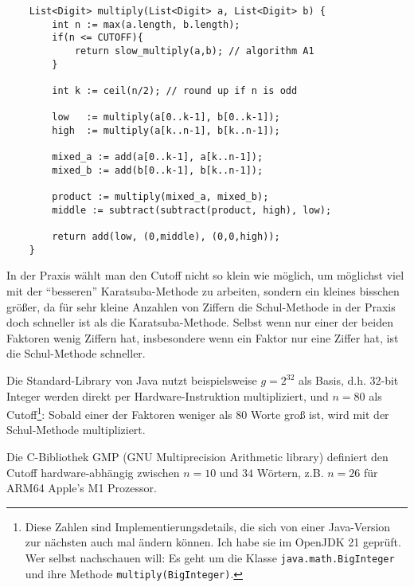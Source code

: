 \begin{algorithm}
    \label{alg:karatsuba}
    \begin{lstlisting}
    List<Digit> multiply(List<Digit> a, List<Digit> b) {
        int n := max(a.length, b.length);
        if(n <= CUTOFF){
            return slow_multiply(a,b); // algorithm A1
        }
    
        int k := ceil(n/2); // round up if n is odd
        
        low   := multiply(a[0..k-1], b[0..k-1]);
        high  := multiply(a[k..n-1], b[k..n-1]);
        
        mixed_a := add(a[0..k-1], a[k..n-1]);
        mixed_b := add(b[0..k-1], b[k..n-1]);
        
        product := multiply(mixed_a, mixed_b);
        middle := subtract(subtract(product, high), low);
        
        return add(low, (0,middle), (0,0,high));
    }
    \end{lstlisting}
\end{algorithm}

\begin{remark}
    In der Praxis wählt man den Cutoff nicht so klein wie möglich, um möglichst viel mit der \enquote{besseren} Karatsuba-Methode zu arbeiten, sondern ein kleines bisschen größer, da für sehr kleine Anzahlen von Ziffern die Schul-Methode in der Praxis doch schneller ist als die Karatsuba-Methode. Selbst wenn nur einer der beiden Faktoren wenig Ziffern hat, insbesondere wenn ein Faktor nur eine Ziffer hat, ist die Schul-Methode schneller.

    \smallskip
    Die Standard-Library von Java nutzt beispielsweise $g=2^{32}$ als Basis, d.h. 32-bit Integer werden direkt per Hardware-Instruktion multipliziert, und $n=80$ als Cutoff\footnote{Diese Zahlen sind Implementierungsdetails, die sich von einer Java-Version zur nächsten auch mal ändern können. Ich habe sie im OpenJDK 21 geprüft. Wer selbst nachschauen will: Es geht um die Klasse \texttt{java.math.BigInteger} und ihre Methode \texttt{multiply(BigInteger)}.}: Sobald einer der Faktoren weniger als $80$ Worte groß ist, wird mit der Schul-Methode multipliziert.

    Die C-Bibliothek GMP (GNU Multiprecision Arithmetic library) definiert den Cutoff hardware-abhängig zwischen $n=10$ und $34$ Wörtern, z.B. $n=26$ für ARM64 Apple's M1 Prozessor.
\end{remark}

